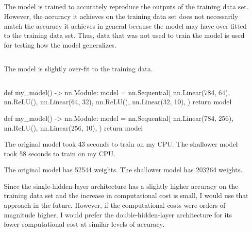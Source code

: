 \documentclass[11pt]{article}
\begin{document}
\subsection{}  %
The model is trained to accurately reproduce the outputs of the training data
set. However, the accuracy it achieves on the training data set does not
necessarily match the accuracy it achieves in general because the model
may have over-fitted to the training data set. Thus, data that was not used to
train the model is used for testing how the model generalizes.

\subsection{}  %
The model is slightly over-fit to the training data.

\subsection{}  %
\label{sec12}
\begin{python}[caption={Original Code},label={12code1}]
def my_model() -> nn.Module:
model = nn.Sequential(
    nn.Linear(784, 64),
    nn.ReLU(),
    nn.Linear(64, 32),
    nn.ReLU(),
    nn.Linear(32, 10),
)
return model
\end{python}

\begin{python}[caption={Modified Code},label={12code2}]
def my_model() -> nn.Module:
model = nn.Sequential(
    nn.Linear(784, 256),
    nn.ReLU(),
    nn.Linear(256, 10),
)
return model
\end{python}

The original model took 43 seconds to train on my CPU. The shallower model took
58 seconds to train on my CPU.

The original model has 52544 weights. The shallower model has 203264 weights.


Since the single-hidden-layer architecture has a slightly higher accuracy on the
training data set and the increase in computational cost is small, I would
use that approach in the future. However, if the computational costs were orders
of magnitude higher, I would prefer the double-hidden-layer architecture for its
lower computational cost at similar levels of accuracy.
\end{document}
